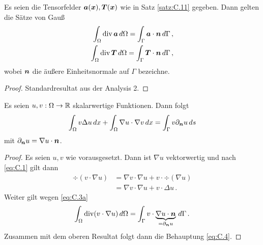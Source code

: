 \begin{satz}\label{satz:C.12}
Es seien die Tensorfelder $\boldsymbol a(\boldsymbol x), \boldsymbol T(\boldsymbol x)$ wie in Satz \ref{satz:C.11} gegeben. Dann gelten die Sätze von Gauß
\begin{subequations}\label{eq:C.3}
\begin{align}\label{eq:C.3a}
	\int_{\Omega} \operatorname{div} \boldsymbol a \, d\Omega = \int_\Gamma \boldsymbol a \cdot \boldsymbol n \, d\Gamma \, , \\
	\label{eq:C.3b}
	\int_{\Omega} \operatorname{div} \boldsymbol T \, d\Omega = \int_\Gamma \boldsymbol T \cdot \boldsymbol n \, d\Gamma  \, , 
\end{align}
\end{subequations}
wobei $\boldsymbol n$ die äußere Einheitsnormale auf $\Gamma$ bezeichne.
\end{satz}

\begin{proof}
Standardresultat aus der Analysis 2.
\end{proof}

\begin{kor}\label{kor:C.13}
Es seien $u,v : \Omega \rightarrow \mathbb{R}$ skalarwertige Funktionen. Dann folgt
\begin{align}\label{eq:C.4}
	\int_{\Omega} v \Delta u \, dx + \int_{\Omega} \nabla u \cdot \nabla v \, dx = \int_{\Gamma} v \partial_{\boldsymbol n} u \, ds
\end{align}
mit $\partial_{\boldsymbol n} u = \nabla u \cdot \boldsymbol n$.
\end{kor}

\begin{proof}
Es seien $u,v$ wie vorausgesetzt. Dann ist $\nabla u$ vektorwertig und nach \eqref{eq:C.1} gilt dann
\begin{align*}
	\div (v \cdot \nabla u) & = \nabla v \cdot \nabla u + v \cdot \div(\nabla u) \\
	& =  \nabla v \cdot \nabla u + v \cdot \Delta u \, .
\end{align*}
Weiter gilt wegen \eqref{eq:C.3a}
\[
	\int_{\Omega} \operatorname{div} (v \cdot \nabla u) \, d\Omega = \int_\Gamma v \cdot \underbrace{\nabla u \cdot \boldsymbol n}_{=\partial_{\boldsymbol n} u} \, d\Gamma \, .
\]
Zusammen mit dem oberen Resultat folgt dann die Behauptung \eqref{eq:C.4}.
\end{proof}




\label{anhang:D}


